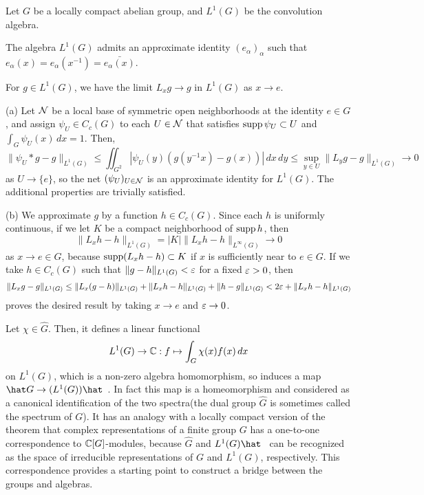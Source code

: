 \documentclass{../../small}
\begin{document}
\begin{lem}
Let $G$ be a locally compact abelian group, and $L^1(G)$ be the convolution algebra.
\begin{parts}
\item The algebra $L^1(G)$ admits an approximate identity $(e_\alpha)_\alpha$ such that $e_\alpha(x)=e_\alpha(x^{-1})=\bar{e_\alpha(x)}$.
\item For $g\in L^1(G)$, we have the limit $L_xg\to g$ in $L^1(G)$ as $x\to e$.
\end{parts}
\end{lem}
\begin{pf}
(a)
Let $\mathcal{N}$ be a local base of symmetric open neighborhoods at the identity $e\in G$, and assign $\psi_U\in C_c(G)$ to each $U\in\mathcal{N}$ that satisfies $\operatorname{supp}\psi_U\subset U$ and $\int_G\psi_U(x)\,dx=1$.
Then,
\[\|\psi_U*g-g\|_{L^1(G)}\le\iint_{G^2}|\psi_U(y)(g(y^{-1}x)-g(x))|\,dx\,dy\le\sup_{y\in U}\|L_yg-g\|_{L^1(G)}\to0\]
as $U\to\{e\}$, so the net $(\psi_U)_{U\in\mathcal{N}}$ is an approximate identity for $L^1(G)$.
The additional properties are trivially satisfied.

(b)
We approximate $g$ by a function $h\in C_c(G)$.
Since each $h$ is uniformly continuous, if we let $K$ be a compact neighborhood of $\operatorname{supp} h$, then
\[\|L_xh-h\|_{L^1(G)}=|K|\|L_xh-h\|_{L^\infty(G)}\to0\]
as $x\to e\in G$, because $\operatorname{supp}(L_xh-h)\subset K$ if $x$ is sufficiently near to $e\in G$.
If we take $h\in C_c(G)$ such that $\|g-h\|_{L^1(G)}<\varepsilon$ for a fixed $\varepsilon>0$, then
\[\|L_xg-g\|_{L^1(G)}\le\|L_x(g-h)\|_{L^1(G)}+\|L_xh-h\|_{L^1(G)}+\|h-g\|_{L^1(G)}<2\varepsilon+\|L_xh-h\|_{L^1(G)}\]
proves the desired result by taking $x\to e$ and $\varepsilon\to0$.
\end{pf}


Let $\chi\in\hat G$.
Then, it defines a linear functional
\[L^1(G)\to\mathbb{C}:f\mapsto\int_G\chi(x)f(x)\,dx\]
on $L^1(G)$, which is a non-zero algebra homomorphism, so induces a map $\hat G\to(L^1(G))\hat\enspace$.
In fact this map is a homeomorphism and considered as a canonical identification of the two spectra(the dual group $\hat G$ is sometimes called the spectrum of $G$).
It has an analogy with a locally compact version of the theorem that complex representations of a finite group $G$ has a one-to-one correspondence to $\mathbb{C}[G]$-modules, because $\hat G$ and $L^1(G)\hat\enspace$ can be recognized as the space of irreducible representations of $G$ and $L^1(G)$, respectively.
This correspondence provides a starting point to construct a bridge between the groups and algebras.
\end{document}
